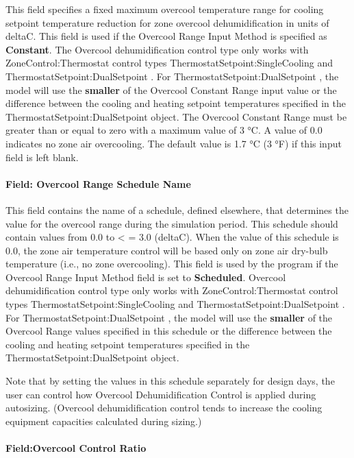 This field specifies a fixed maximum overcool temperature range for cooling setpoint temperature reduction for zone overcool dehumidification in units of deltaC. This field is used if the Overcool Range Input Method is specified as \textbf{Constant}. The Overcool dehumidification control type only works with ZoneControl:Thermostat control types ThermostatSetpoint:SingleCooling and ThermostatSetpoint:DualSetpoint . For ThermostatSetpoint:DualSetpoint , the model will use the \textbf{smaller} of the Overcool Constant Range input value or the difference between the cooling and heating setpoint temperatures specified in the ThermostatSetpoint:DualSetpoint object. The Overcool Constant Range must be greater than or equal to zero with a maximum value of 3 °C. A value of 0.0 indicates no zone air overcooling. The default value is 1.7 °C (3 °F) if this input field is left blank.

\paragraph{Field: Overcool Range Schedule Name}\label{field-overcool-range-schedule-name}

This field contains the name of a schedule, defined elsewhere, that determines the value for the overcool range during the simulation period. This schedule should contain values from 0.0 to \textless{} = 3.0 (deltaC). When the value of this schedule is 0.0, the zone air temperature control will be based only on zone air dry-bulb temperature (i.e., no zone overcooling). This field is used by the program if the Overcool Range Input Method field is set to \textbf{Scheduled}. Overcool dehumidification control type only works with ZoneControl:Thermostat control types ThermostatSetpoint:SingleCooling and ThermostatSetpoint:DualSetpoint . For ThermostatSetpoint:DualSetpoint , the model will use the \textbf{smaller} of the Overcool Range values specified in this schedule or the difference between the cooling and heating setpoint temperatures specified in the ThermostatSetpoint:DualSetpoint object.

Note that by setting the values in this schedule separately for design days, the user can control how Overcool Dehumidification Control is applied during autosizing. (Overcool dehumidification control tends to increase the cooling equipment capacities calculated during sizing.)

\paragraph{Field:Overcool Control Ratio}\label{fieldovercool-control-ratio}

